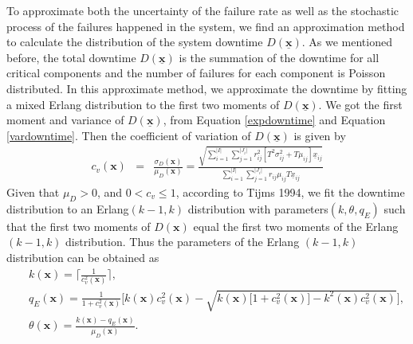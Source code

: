 \documentclass[preprint,12pt]{elsarticle}
\begin{document}
To approximate both the uncertainty of the failure rate as well as the stochastic process of the failures happened in the system, we find an approximation method to calculate the distribution of the system downtime $D(\underline{\boldsymbol{x}})$. As we mentioned before, the total downtime $D(\underline{\boldsymbol{x}})$ is the summation of the downtime for all critical components and the number of failures for each component is Poisson distributed. In this approximate method, we approximate the downtime by fitting a mixed Erlang distribution to the first two moments of $D(\underline{\boldsymbol{x}})$. We got the first moment and variance of $D(\underline{\boldsymbol{x}})$, from Equation \eqref{expdowntime} and Equation \eqref{vardowntime}. Then the coefficient of variation of $D(\underline{\boldsymbol{x}})$ is given by
\small
\begin{eqnarray}
c_{v}(\boldsymbol{x}) &=& \frac{\sigma_{D}(\boldsymbol{x})}{\mu_{D}(\boldsymbol{x})} = \frac{\sqrt{\sum_{i=1}^{\lvert I \rvert}\sum_{j=1}^{\lvert J_{i} \rvert}r_{ij}^{2}[T^{2}\sigma^{2}_{ij}+T\mu_{ij}]\underline{x}_{ij}}}{\sum^{\lvert I \rvert}_{i=1} \sum_{j=1}^{\lvert J_{i} \rvert}{r_{ij}\mu_{ij}T\underline{x}_{ij}}} \label{cv}
\end{eqnarray}
\normalsize
Given that $\mu_{D}>0$, and $0<c_{v}\leq 1$, according to Tijms 1994, we fit the downtime distribution to an Erlang$(k-1,k)$ distribution with parameters$(k,\theta,q_{E})$ such that the first two moments of $D(\boldsymbol{x})$ equal the first two moments of the Erlang $(k-1,k)$ distribution. Thus the parameters of the Erlang $(k-1,k)$ distribution can be obtained as
\small
\begin{eqnarray}
&&k(\boldsymbol{x}) = \lceil \frac{1}{c_{v}^{2}(\boldsymbol{x})} \rceil, \label{k1}\\
&&q_{E}(\boldsymbol{x})= \frac{1}{1+c^{2}_{v}(\boldsymbol{x})}\bigg[k(\boldsymbol{x})c^{2}_{v}(\boldsymbol{x})-\sqrt{k(\boldsymbol{x})\big[1+c^{2}_{v}(\boldsymbol{x})\big]-k^{2}(\boldsymbol{x})c^{2}_{v}(\boldsymbol{x})} \bigg], \label{q1}\\
&&\theta(\boldsymbol{x}) = \frac{k(\boldsymbol{x})-q_{E}(\boldsymbol{x})}{\mu_{D}(\boldsymbol{x})}. \label{theta1}
\end{eqnarray}
\end{document}
